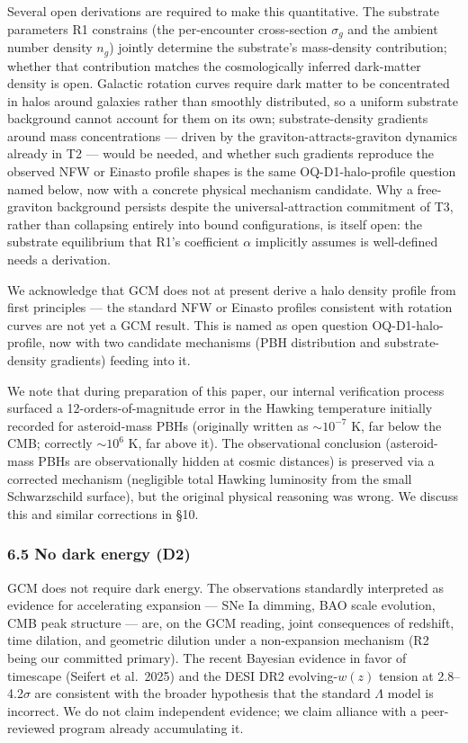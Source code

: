 \documentclass[12pt]{article}
\theoremstyle{definition}
\theoremstyle{remark}
\begin{document}
Several open derivations are required to make this quantitative. The
substrate parameters R1 constrains (the per-encounter cross-section
\(\sigma_g\) and the ambient number density \(n_g\)) jointly determine
the substrate's mass-density contribution; whether that contribution
matches the cosmologically inferred dark-matter density is open.
Galactic rotation curves require dark matter to be concentrated in halos
around galaxies rather than smoothly distributed, so a uniform substrate
background cannot account for them on its own; substrate-density
gradients around mass concentrations --- driven by the
graviton-attracts-graviton dynamics already in T2 --- would be needed,
and whether such gradients reproduce the observed NFW or Einasto profile
shapes is the same OQ-D1-halo-profile question named below, now with a
concrete physical mechanism candidate. Why a free-graviton background
persists despite the universal-attraction commitment of T3, rather than
collapsing entirely into bound configurations, is itself open: the
substrate equilibrium that R1's coefficient \(\alpha\) implicitly
assumes is well-defined needs a derivation.

We acknowledge that GCM does not at present derive a halo density
profile from first principles --- the standard NFW or Einasto profiles
consistent with rotation curves are not yet a GCM result. This is named
as open question OQ-D1-halo-profile, now with two candidate mechanisms
(PBH distribution and substrate-density gradients) feeding into it.

We note that during preparation of this paper, our internal verification
process surfaced a 12-orders-of-magnitude error in the Hawking
temperature initially recorded for asteroid-mass PBHs (originally
written as \(\sim 10^{-7}\) K, far below the CMB; correctly
\(\sim 10^6\) K, far above it). The observational conclusion
(asteroid-mass PBHs are observationally hidden at cosmic distances) is
preserved via a corrected mechanism (negligible total Hawking luminosity
from the small Schwarzschild surface), but the original physical
reasoning was wrong. We discuss this and similar corrections in §10.

\subsubsection{6.5 No dark energy (D2)}\label{no-dark-energy-d2}

GCM does not require dark energy. The observations standardly
interpreted as evidence for accelerating expansion --- SNe Ia dimming,
BAO scale evolution, CMB peak structure --- are, on the GCM reading,
joint consequences of redshift, time dilation, and geometric dilution
under a non-expansion mechanism (R2 being our committed primary). The
recent Bayesian evidence in favor of timescape (Seifert et al.~2025) and
the DESI DR2 evolving-\(w(z)\) tension at 2.8--4.2\(\sigma\) are
consistent with the broader hypothesis that the standard \(\Lambda\)
model is incorrect. We do not claim independent evidence; we claim
alliance with a peer-reviewed program already accumulating it.
\end{document}
